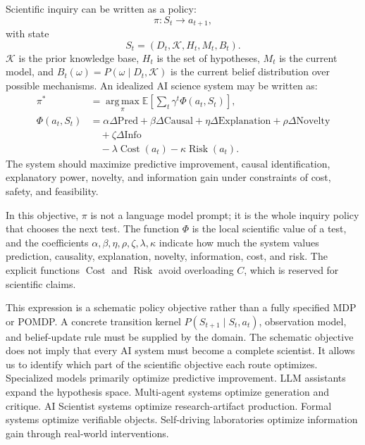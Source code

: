 \documentclass[11pt,a4paper]{article}
\newcommand{\E}{\mathbb{E}}
\newcommand{\argmax}{\operatorname*{arg\,max}}
\newcommand{\Know}{\mathcal{K}}
\newcommand{\Cost}{\operatorname{Cost}}
\newcommand{\Risk}{\operatorname{Risk}}
\begin{document}
Scientific inquiry can be written as a policy:
\begin{equation}
  \pi:S_t\rightarrow a_{t+1},
\end{equation}
with state
\begin{equation}
  S_t=(D_t,\Know,H_t,M_t,B_t).
\end{equation}
$\Know$ is the prior knowledge base, $H_t$ is the set of hypotheses, $M_t$ is the current model, and $B_t(\omega)=P(\omega\mid D_t,\Know)$ is the current belief distribution over possible mechanisms. An idealized AI science system may be written as:
\begin{equation}
\begin{aligned}
\pi^\ast
&=\argmax_{\pi}\E\left[\sum_t \gamma^t\Phi(a_t,S_t)\right],\\
\Phi(a_t,S_t)
&=\alpha\Delta\mathrm{Pred}
+\beta\Delta\mathrm{Causal}
+\eta\Delta\mathrm{Explanation}
+\rho\Delta\mathrm{Novelty}\\
&\quad+\zeta\Delta\mathrm{Info}\\
&\quad-\lambda \Cost(a_t)-\kappa \Risk(a_t).
\end{aligned}
\end{equation}
The system should maximize predictive improvement, causal identification, explanatory power, novelty, and information gain under constraints of cost, safety, and feasibility.

In this objective, $\pi$ is not a language model prompt; it is the whole inquiry policy that chooses the next test. The function $\Phi$ is the local scientific value of a test, and the coefficients $\alpha,\beta,\eta,\rho,\zeta,\lambda,\kappa$ indicate how much the system values prediction, causality, explanation, novelty, information, cost, and risk. The explicit functions $\Cost$ and $\Risk$ avoid overloading $C$, which is reserved for scientific claims.

This expression is a schematic policy objective rather than a fully specified MDP or POMDP. A concrete transition kernel $P(S_{t+1}\mid S_t,a_t)$, observation model, and belief-update rule must be supplied by the domain. The schematic objective does not imply that every AI system must become a complete scientist. It allows us to identify which part of the scientific objective each route optimizes. Specialized models primarily optimize predictive improvement. LLM assistants expand the hypothesis space. Multi-agent systems optimize generation and critique. AI Scientist systems optimize research-artifact production. Formal systems optimize verifiable objects. Self-driving laboratories optimize information gain through real-world interventions.
\end{document}
